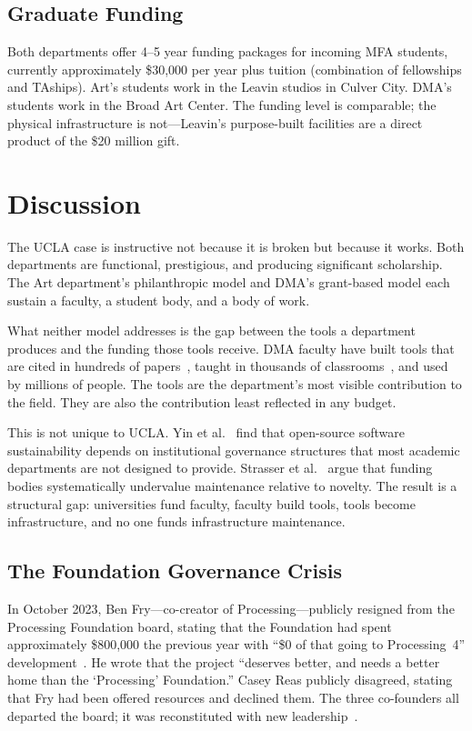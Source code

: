\documentclass[10pt,letterpaper,twocolumn]{article}
\newcommand{\dma}{\textsc{DMA}}
\begin{document}
\subsection{Graduate Funding}

Both departments offer 4--5 year funding packages for incoming MFA students, currently approximately \$30,000 per year plus tuition (combination of fellowships and TAships). Art's students work in the Leavin studios in Culver City. \dma{}'s students work in the Broad Art Center. The funding level is comparable; the physical infrastructure is not---Leavin's purpose-built facilities are a direct product of the \$20 million gift.

\section{Discussion}

The UCLA case is instructive not because it is broken but because it works. Both departments are functional, prestigious, and producing significant scholarship. The Art department's philanthropic model and \dma{}'s grant-based model each sustain a faculty, a student body, and a body of work.

What neither model addresses is the gap between the tools a department produces and the funding those tools receive. \dma{} faculty have built tools that are cited in hundreds of papers~\citep{reas2006processing}, taught in thousands of classrooms~\citep{greenberg2012creative, peppler2009creative}, and used by millions of people. The tools are the department's most visible contribution to the field. They are also the contribution least reflected in any budget.

This is not unique to UCLA. Yin et al.~\citep{yin2022oss} find that open-source software sustainability depends on institutional governance structures that most academic departments are not designed to provide. Strasser et al.~\citep{strasser2022funding} argue that funding bodies systematically undervalue maintenance relative to novelty. The result is a structural gap: universities fund faculty, faculty build tools, tools become infrastructure, and no one funds infrastructure maintenance.

\subsection{The Foundation Governance Crisis}

In October 2023, Ben Fry---co-creator of Processing---publicly resigned from the Processing Foundation board, stating that the Foundation had spent approximately \$800,000 the previous year with ``\$0 of that going to Processing~4'' development~\citep{fry2023resignation}. He wrote that the project ``deserves better, and needs a better home than the `Processing' Foundation.'' Casey Reas publicly disagreed, stating that Fry had been offered resources and declined them. The three co-founders all departed the board; it was reconstituted with new leadership~\citep{pfboardtransition2023}.
\end{document}

